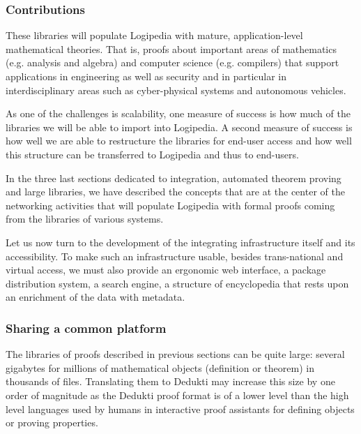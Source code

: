 \subsubsection*{Contributions}

These libraries will populate Logipedia with mature,
application-level mathematical theories. That is, proofs about
important areas of mathematics (e.g. analysis and algebra) and
computer science (e.g. compilers) that support applications in
engineering as well as security and in particular in interdisciplinary
areas such as cyber-physical systems and autonomous vehicles.

As one of the challenges is scalability, one measure of success is how
much of the libraries we will be able to import into Logipedia. A
second measure of success is how well we are able to restructure the
libraries for end-user access and how well this structure can be
transferred to Logipedia and thus to end-users.


In the three last sections dedicated to integration, automated theorem
proving and large libraries, we have described the concepts that are
at the center of the networking activities that will populate
Logipedia with formal proofs coming from the libraries of various
systems.

Let us now turn to the development of the integrating infrastructure
itself and its accessibility.
To make such an infrastructure
usable, besides trans-national and virtual access,
we must also provide an ergonomic web interface, a package
distribution system, a search engine, a structure of encyclopedia
that rests upon an enrichment of the data with metadata.

\subsubsection*{Sharing a common platform}

The libraries of proofs described in previous sections can be quite
large: several gigabytes for millions of mathematical objects
(definition or theorem) in thousands of files. Translating them to
Dedukti may increase this size by one order of magnitude as the
Dedukti proof format is of a lower level than the high level languages
used by humans in interactive proof assistants for defining objects or
proving properties.

